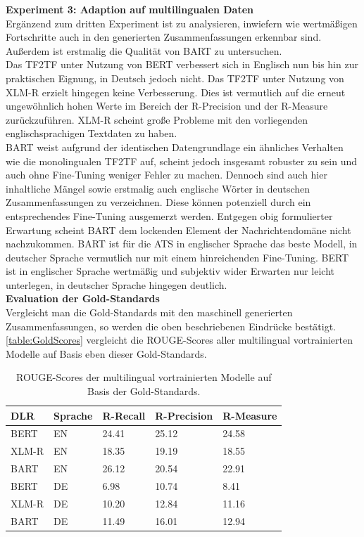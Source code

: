 \noindent
\textbf{Experiment 3: Adaption auf multilingualen Daten}\\
\noindent
Ergänzend zum dritten Experiment ist zu analysieren, inwiefern wie wertmäßigen Fortschritte auch in den generierten Zusammenfassungen erkennbar sind. Außerdem ist erstmalig die Qualität von \ac{BART} zu untersuchen.\\

\noindent
Das \ac{TF2TF} unter Nutzung von \ac{BERT} verbessert sich in Englisch nun bis hin zur praktischen Eignung, in Deutsch jedoch nicht. Das \ac{TF2TF} unter Nutzung von \ac{XLM-R} erzielt hingegen keine Verbesserung. Dies ist vermutlich auf die erneut ungewöhnlich hohen Werte im Bereich der R-Precision und der R-Measure zurückzuführen. \ac{XLM-R} scheint große Probleme mit den vorliegenden englischsprachigen Textdaten zu haben.\\

\noindent
\ac{BART} weist aufgrund der identischen Datengrundlage ein ähnliches Verhalten wie die monolingualen \ac{TF2TF} auf, scheint jedoch insgesamt robuster zu sein und auch ohne Fine-Tuning weniger Fehler zu machen. Dennoch sind auch hier inhaltliche Mängel sowie erstmalig auch englische Wörter in deutschen Zusammenfassungen zu verzeichnen. Diese können potenziell durch ein entsprechendes Fine-Tuning ausgemerzt werden. Entgegen obig formulierter Erwartung scheint \ac{BART} dem lockenden Element der Nachrichtendomäne nicht nachzukommen. \ac{BART} ist für die \ac{ATS} in englischer Sprache das beste Modell, in deutscher Sprache vermutlich nur mit einem hinreichenden Fine-Tuning. \ac{BERT} ist in englischer Sprache wertmäßig und subjektiv wider Erwarten nur leicht unterlegen, in deutscher Sprache hingegen deutlich.\\

\noindent
\textbf{Evaluation der Gold-Standards}\\
\noindent
Vergleicht man die Gold-Standards mit den maschinell generierten Zusammenfassungen, so werden die oben beschriebenen Eindrücke bestätigt. \autoref{table:GoldScores} vergleicht die \ac{ROUGE}-Scores aller multilingual vortrainierten Modelle auf Basis eben dieser Gold-Standards. 
\newpage

\begin{table}[htb]
\centering
\begin{tabular}{ | p{2.5cm} | p{2.5cm} | p{2.5cm} | p{2.5cm} | p{2.5cm} | }
\hline
\textbf{DLR} & \textbf{Sprache} & \textbf{R-Recall} & \textbf{R-Precision} & \textbf{R-Measure} \\
\hline
BERT & EN & 24.41 & 25.12 & 24.58 \\
\hline
XLM-R & EN & 18.35 & 19.19 & 18.55 \\
\hline
BART & EN & 26.12 & 20.54 & 22.91 \\
\hline
BERT & DE & 6.98 & 10.74 & 8.41 \\
\hline
XLM-R & DE & 10.20 & 12.84 & 11.16 \\
\hline
BART & DE & 11.49 & 16.01 & 12.94 \\
\hline
\end{tabular}
\caption{ROUGE-Scores der multilingual vortrainierten Modelle auf Basis der Gold-Standards.}
\label{table:GoldScores}
\end{table}

